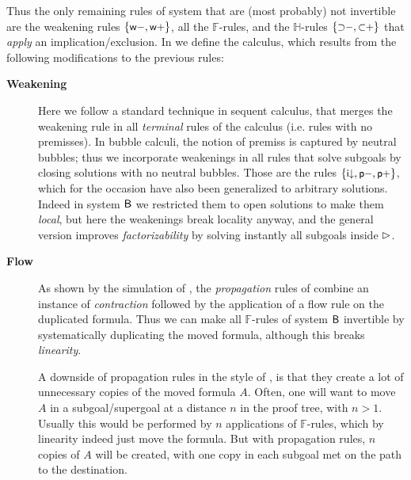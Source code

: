 Thus the only remaining rules of system  that are (most probably) not
invertible are the weakening rules $\{\text{\small$\mathsf{w{-}}$},\text{\small$\mathsf{w{+}}$}\}$, all the
$\mathbb{F}$-rules, and the $\mathbb{H}$-rules $\{\text{\small$\mathsf{{\supset}{-}}$},
\text{\small$\mathsf{{\subset}{+}}$}\}$ that \emph{apply} an implication/exclusion.
In  we define the  calculus, which results
from the following modifications to the previous rules:
\begin{description}
  \item[\textbf{Weakening}]
    Here we follow a standard technique in sequent calculus, that merges the
    weakening rule in all \emph{terminal} rules of the calculus (i.e. rules with
    no premisses). In bubble calculi, the notion of premiss is captured by
    neutral bubbles; thus we incorporate weakenings in all rules that solve
    subgoals by closing solutions with no neutral bubbles. Those are the rules
    $\{\text{\small$\mathsf{i{\downarrow}}$},\text{\small$\mathsf{p{-}}$},\text{\small$\mathsf{p{+}}$}\}$, which for the occasion have
    also been generalized to arbitrary solutions. Indeed in system $\sysB$ we
    restricted them to open solutions to make them \emph{local}, but here the
    weakenings break locality anyway, and the general version improves
    \emph{factorizability} by solving instantly all subgoals inside $\mathbin{\rhd}$.

  \item[\textbf{Flow}]
    As shown by the simulation of , the
    \emph{propagation} rules of  combine an instance of
    \emph{contraction} followed by the application of a flow rule on the
    duplicated formula. Thus we can make all $\mathbb{F}$-rules of system
    $\sysB$ invertible by systematically duplicating the moved formula, although
    this breaks \emph{linearity}.

    A downside of propagation rules in the style of , is that they
    create a lot of unnecessary copies of the moved formula $A$. Often, one will
    want to move $A$ in a subgoal/supergoal at a distance $n$ in the proof tree,
    with $n > 1$. Usually this would be performed by $n$ applications of
    $\mathbb{F}$-rules, which by linearity indeed just move the formula. But with
    propagation rules, $n$ copies of $A$ will be created, with one copy in each
    subgoal met on the path to the destination.


\end{description}
